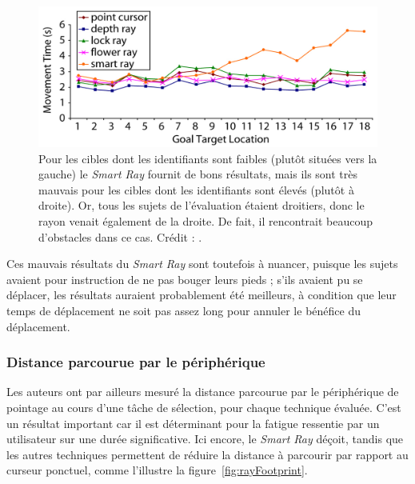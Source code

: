 	\begin{figure}[H]
		\centering
		\includegraphics[width=\textwidth]{figures/ch2/smartRayLocation}
		\caption[\emph{Smart Ray} et emplacement des cibles]{Pour les cibles dont les identifiants sont faibles (plutôt situées vers la gauche) le \emph{Smart Ray} fournit de bons résultats, mais ils sont très mauvais pour les cibles dont les identifiants sont élevés (plutôt à droite). Or, tous les sujets de l'évaluation étaient droitiers, donc le rayon venait également de la droite. De fait, il rencontrait beaucoup d'obstacles dans ce cas. Crédit : \cite{grossman2006design}.}
		\label{fig:smartRayLocation}
	\end{figure}

	Ces mauvais résultats du \emph{Smart Ray} sont toutefois à nuancer, puisque les sujets avaient pour instruction de ne pas bouger leurs pieds ; s'ils avaient pu se déplacer, les résultats auraient probablement été meilleurs, à condition que leur temps de déplacement ne soit pas assez long pour annuler le bénéfice du déplacement.
	
	\subsubsection{Distance parcourue par le périphérique}
	Les auteurs ont par ailleurs mesuré la distance parcourue par le périphérique de pointage au cours d'une tâche de sélection, pour chaque technique évaluée. C'est un résultat important car il est déterminant pour la fatigue ressentie par un utilisateur sur une durée significative. Ici encore, le \emph{Smart Ray} déçoit, tandis que les autres techniques permettent de réduire la distance à parcourir par rapport au curseur ponctuel, comme l'illustre la figure~\ref{fig:rayFootprint}.

